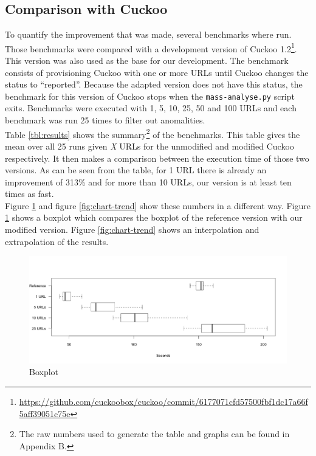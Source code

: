 \pagebreak

\restoregeometry
{}
\setcounter{page}{\thesavepage}

\subsection{Comparison with Cuckoo}

To quantify the improvement that was made, several benchmarks where run. Those benchmarks were compared with a development version of Cuckoo 1.2\footnote{\url{https://github.com/cuckoobox/cuckoo/commit/6177071cfd57500fbf1dc17a66f5aff39051c75e}}. This version was also used as the base for our development. The benchmark consists of provisioning Cuckoo with one or more URLs until Cuckoo changes the status to ``reported''. Because the adapted version does not have this status, the benchmark for this version of Cuckoo stops when the \texttt{mass-analyse.py} script exits. Benchmarks were executed with 1, 5, 10, 25, 50 and 100 URLs and each benchmark was run 25 times to filter out anomalities.\\

Table \ref{tbl:results} shows the summary\footnote{The raw numbers used to generate the table and graphs can be found in Appendix B.} of the benchmarks. This table gives the mean over all 25 runs given \textit{X} URLs for the unmodified and modified Cuckoo respectively. It then makes a comparison between the execution time of those two versions. As can be seen from the table, for 1 URL there is already an improvement of 313\% and for more than 10 URLs, our version is at least ten times as fast.\\

Figure \ref{fig:chart-box} and figure \ref{fig:chart-trend} show these numbers in a different way. Figure \ref{fig:chart-box} shows a boxplot which compares the boxplot of the reference version with our modified version. Figure \ref{fig:chart-trend} shows an interpolation and extrapolation of the results.


\begin{figure}[h]
    \centering
    \centerline{\includegraphics[width=20cm]{Images/chart-box.png}}
    \caption{Boxplot}
    \label{fig:chart-box}
\end{figure}

